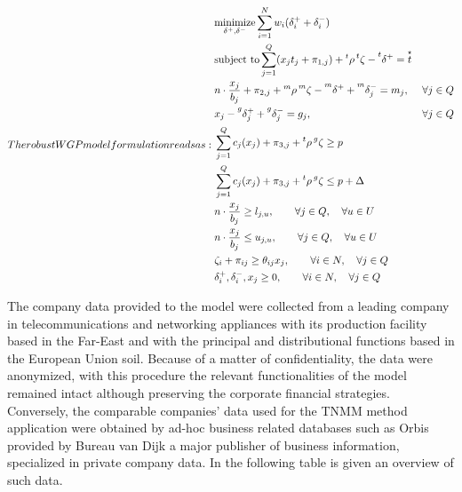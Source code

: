 \documentclass[conference,final,a4paper]{IEEEtran}
\begin{document}
\begin{subequations}
The robust WGP model formulation reads as:
\begin{align}
& \underset{\delta^+,\delta^-}{\text{minimize}} \sum^{N}_{i=1}w_i(\delta^+_i + \delta^-_i)\\
& \text{subject to} \sum^{Q}_{j=1}(x_j t_j + \pi_{1,j})+ \prescript{t}{}{\rho} \prescript{t}{}{\zeta} - \prescript{t}{}{\delta^+}  =\overset{\star}{t} \\
& n\cdot \frac{x_j}{b_j}+\pi_{2,j}+ \prescript{m}{}{\rho} \prescript{m}{}{\zeta} - \prescript{m}{}{\delta^+} + \prescript{m}{}{\delta^-_j} = {m_j}, & \forall j \in Q \\
& {x_j} - \prescript{g}{}{\delta^+_j} + \prescript{g}{}{\delta^-_j}  = {g_j}, & \forall j \in Q \\
& \sum^{Q}_{j=1} c_j(x_j) + \pi_{3,j} + \prescript{t}{}{\rho} \prescript{g}{}{\zeta} \geq p \\
& \sum^{Q}_{j=1} c_j(x_j) + \pi_{3,j} + \prescript{t}{}{\rho} \prescript{g}{}{\zeta} \leq p + \Delta \\
& n\cdot \frac{x_j}{b_j} \geq {l_{j,u}}, \qquad  \forall j \in Q, \quad \forall u \in U \label{lquartile} \\
& n\cdot \frac{x_j}{b_j} \leq {u_{j,u}}, \qquad \forall j \in Q, \quad \forall u \in U \label{uquartile} \\
& \zeta_i + \pi_{ij} \geq \theta_{ij} x_{j},  \qquad \forall i \in N, \quad \forall j \in Q \\
& \delta^+_i,\delta^-_i,x_j\geq 0, \qquad \forall i \in N, \quad \forall j \in Q
\end{align}
\end{subequations}

The company data provided to the model were collected from a leading company in telecommunications and networking appliances with its production facility based in the Far-East and with the principal and distributional functions based in the European Union soil. Because of a matter of confidentiality, the data were anonymized, with this procedure the relevant functionalities of the model remained intact although preserving the corporate financial strategies. Conversely, the comparable companies' data used for the TNMM method application were obtained by ad-hoc business related databases such as Orbis \cite{orbis} provided by Bureau van Dijk a major publisher of business information, specialized in private company data. In the following table is given an overview of such data.
\end{document}
